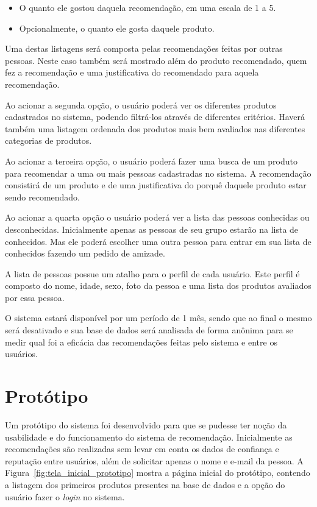\begin{itemize}
	\item O quanto ele gostou daquela recomendação, em uma escala de 1 a 5.
	\item Opcionalmente, o quanto ele gosta daquele produto.
\end{itemize}

 Uma destas listagens será composta pelas recomendações feitas por outras pessoas. Neste caso também será mostrado além do produto recomendado, quem fez a recomendação e uma justificativa do recomendado para aquela recomendação.

 Ao acionar a segunda opção, o usuário poderá ver os diferentes produtos cadastrados no sistema, podendo filtrá-los através de diferentes critérios. Haverá também uma listagem ordenada dos produtos mais bem avaliados nas diferentes categorias de produtos.

 Ao acionar a terceira opção, o usuário poderá fazer uma busca de um produto para recomendar a uma ou mais pessoas cadastradas no sistema. A recomendação consistirá de um produto e de uma justificativa do porquê daquele produto estar sendo recomendado.

 Ao acionar a quarta opção o usuário poderá ver a lista das pessoas conhecidas ou desconhecidas. Inicialmente apenas as pessoas de seu grupo estarão na lista de conhecidos. Mas ele poderá escolher uma outra pessoa para entrar em sua lista de conhecidos fazendo um pedido de amizade.

 A lista de pessoas possue um atalho para o perfil de cada usuário. Este perfil é composto do nome, idade, sexo, foto da pessoa e uma lista dos produtos avaliados por essa pessoa.

 O sistema estará disponível por um período de 1 mês, sendo que ao final o mesmo será desativado e sua base de dados será analisada de forma anônima para se medir qual foi a eficácia das recomendações feitas pelo sistema e entre os usuários.

\section{Protótipo}
\label{cha:prototipo}

 Um protótipo do sistema foi desenvolvido para que se pudesse ter noção da usabilidade e do funcionamento do sistema de recomendação. Inicialmente as recomendações são realizadas sem levar em conta os dados de confiança e reputação entre usuários, além de solicitar apenas o nome e e-mail da pessoa. A Figura~\ref{fig:tela_inicial_prototipo} mostra a página inicial do protótipo, contendo a listagem dos primeiros produtos presentes na base de dados e a opção do usuário fazer o \textit{login} no sistema.
 
